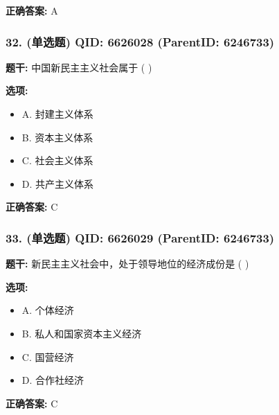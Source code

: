 \documentclass[12pt,UTF8]{ctexart}
\begin{document}
\textbf{正确答案:}
A

\vspace{0.3em}\hrulefill\vspace{0.7em}

\subsubsection*{32. (单选题) \small QID: 6626028 (ParentID: 6246733)}

\textbf{题干:}
中国新民主主义社会属于  ( )



\textbf{选项:}
\begin{itemize}[leftmargin=*]

  \item A. 封建主义体系

  \item B. 资本主义体系

  \item C. 社会主义体系

  \item D. 共产主义体系

\end{itemize}

\textbf{正确答案:}
C

\vspace{0.3em}\hrulefill\vspace{0.7em}

\subsubsection*{33. (单选题) \small QID: 6626029 (ParentID: 6246733)}

\textbf{题干:}
新民主主义社会中，处于领导地位的经济成份是  ( )



\textbf{选项:}
\begin{itemize}[leftmargin=*]

  \item A. 个体经济

  \item B. 私人和国家资本主义经济

  \item C. 国营经济

  \item D. 合作社经济

\end{itemize}

\textbf{正确答案:}
C
\end{document}
